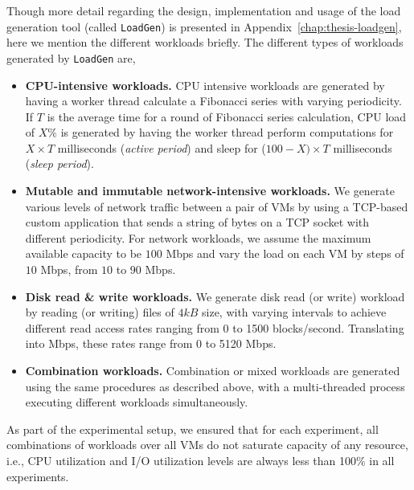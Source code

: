 Though more detail regarding the design, implementation
and usage of the load generation tool (called \texttt{LoadGen})
is presented in Appendix~\ref{chap:thesis-loadgen}, here 
we mention the different workloads briefly.
The different types of workloads generated by \texttt{LoadGen} are,
% 
\begin{itemize}
\item \textbf{CPU-intensive workloads.}
CPU intensive workloads are generated by having a worker
thread calculate a Fibonacci series with varying periodicity.
If $T$ is the average time for a round of Fibonacci series calculation,
CPU load of $X\%$ is generated by having the worker thread perform
computations for $X \times T$ milliseconds (\emph{active period}) and
sleep for ($100-X) \times T$ milliseconds (\emph{sleep period}).
\item \textbf{Mutable and immutable network-intensive workloads.} 
We generate various levels of network traffic between a pair of VMs by using
a TCP-based custom application that sends a string of bytes on a
TCP socket with different periodicity.
For network workloads, we assume the maximum available capacity 
to be $100$ Mbps and vary the load on each VM by steps 
of $10$ Mbps, from $10$ to $90$ Mbps.
\item \textbf{Disk read \& write workloads.}
We generate disk read (or write) workload by reading (or writing) files  
of $4 kB$ size, with varying intervals to achieve different read access
rates ranging from 0 to 1500 blocks/second. Translating into Mbps, these
rates range from 0 to 5120 Mbps.
\item \textbf{Combination workloads.}
Combination or mixed workloads are generated using 
the same procedures as described above, with a 
multi-threaded process executing different workloads 
simultaneously.
\end{itemize}
As part of the experimental setup, we ensured that for each 
experiment, all combinations of workloads over all VMs do not 
saturate capacity of any resource, i.e., CPU utilization and 
I/O utilization levels are always less than 100\% in all experiments.

